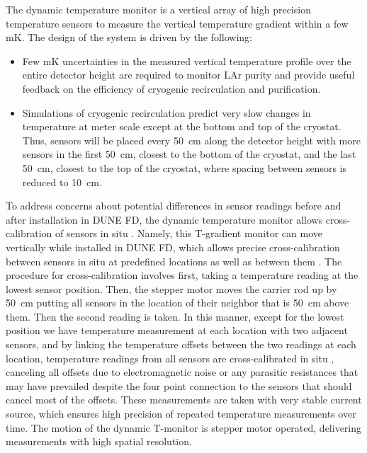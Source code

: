 The dynamic temperature monitor is a vertical array of high precision temperature sensors to measure the vertical temperature gradient within a few mK. The design of the system is driven by the following:
\begin{itemize}
\item
Few mK uncertainties in the measured vertical temperature profile over the entire detector height are required to monitor LAr purity and provide useful feedback on the efficiency of cryogenic recirculation and purification.
\item
Simulations of cryogenic recirculation predict very slow changes in temperature at meter scale except at the bottom and top of the cryostat. Thus, sensors will be placed every \SI{50}{cm} along the detector height with more sensors in the first \SI{50}{cm}, closest to the bottom of the cryostat, and the last \SI{50}{cm}, closest to the top of the cryostat, where spacing between sensors is reduced to \SI{10}{cm}.
 \end{itemize}


To address concerns about potential differences in sensor readings before and after installation in DUNE FD, the dynamic temperature monitor  allows cross-calibration of sensors in situ  . Namely, this T-gradient monitor  can move vertically while installed in DUNE FD, which allows precise cross-calibration between sensors in situ  at predefined locations as well as between them  .  The procedure for cross-calibration involves first, taking a temperature reading at the lowest sensor position. Then, the stepper motor moves the carrier rod up by \SI{50}{cm} putting all sensors in the location of their neighbor that is \SI{50}{cm} above them. Then the second reading is taken. In this manner, except for the lowest position we have temperature measurement at each location with two adjacent sensors, and by linking the temperature offsets between the two readings at each location, temperature readings from all sensors are cross-calibrated in situ  , canceling all offsets due to electromagnetic noise or any parasitic resistances that may have prevailed despite the four point connection to the sensors that should cancel most of the offsets. These measurements are taken with very stable current source, which ensures high precision of repeated temperature measurements over time. The motion of the dynamic T-monitor is stepper motor operated, delivering measurements with high spatial resolution. 

